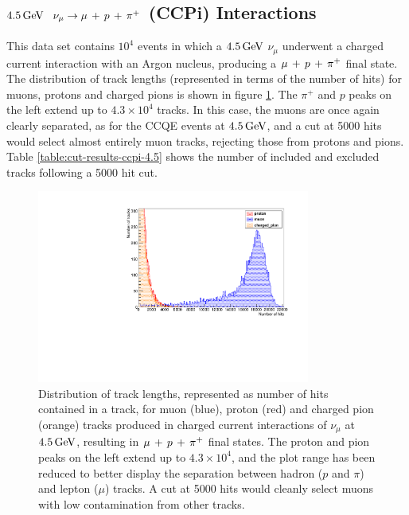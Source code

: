 \subsection{$4.5\GeV$ \texorpdfstring{$\nu_\mu \rightarrow \mu\,+\,p\,+\,\pi^{+}$}{ν\_μ → μ + p + π⁺} (\texorpdfstring{\acs{CCPi}}{CC1π}) Interactions}
This data set contains $10^4$ events in which a $4.5\GeV$ $\nu_\mu$ underwent a charged current interaction with an Argon nucleus, producing a $\mu\,+\,p\,+\,\pi^{+}$ final state. The distribution of track lengths (represented in terms of the number of hits) for muons, protons and charged pions is shown in figure \ref{fig:ccpi-track-lengths-4500MeV}. The $\pi^+$ and $p$ peaks on the left extend up to $4.3\times10^4$ tracks. In this case, the muons are once again clearly separated, as for the CCQE events at $4.5\GeV$, and a cut at 5000 hits would select almost entirely muon tracks, rejecting those from protons and pions. Table \ref{table:cut-results-ccpi-4.5} shows the number of included and excluded tracks following a 5000 hit cut.

\begin{figure}
\centering
\includegraphics[angle=-90,width=0.8\textwidth]{chapters/particleid_images/tracks-ccpi-4500MeV}
\caption[Track length distribution for $\mu$, $p$ and $\pi^+$ from $4.5\GeV$ neutrinos (\acs{CCPi})]{\label{fig:ccpi-track-lengths-4500MeV}Distribution of track lengths, represented as number of hits contained in a track, for muon (blue), proton (red) and charged pion (orange) tracks produced in charged current interactions of $\nu_\mu$ at $4.5\GeV$, resulting in $\mu\,+\,p\,+\,\pi^{+}$ final states. The proton and pion peaks on the left extend up to $4.3\times10^4$, and the plot range has been reduced to better display the separation between hadron ($p$ and $\pi$) and lepton ($\mu$) tracks. A cut at 5000 hits would cleanly select muons with low contamination from other tracks.}
\end{figure}

